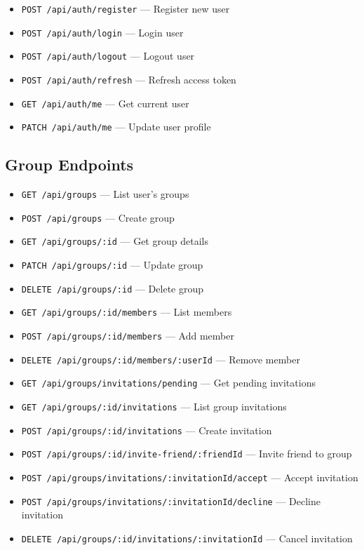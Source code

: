 \documentclass[11pt,a4paper]{article}
\begin{document}
\begin{itemize}
    \item \texttt{POST /api/auth/register} --- Register new user
    \item \texttt{POST /api/auth/login} --- Login user
    \item \texttt{POST /api/auth/logout} --- Logout user
    \item \texttt{POST /api/auth/refresh} --- Refresh access token
    \item \texttt{GET /api/auth/me} --- Get current user
    \item \texttt{PATCH /api/auth/me} --- Update user profile
\end{itemize}

\subsection{Group Endpoints}

\begin{itemize}
    \item \texttt{GET /api/groups} --- List user's groups
    \item \texttt{POST /api/groups} --- Create group
    \item \texttt{GET /api/groups/:id} --- Get group details
    \item \texttt{PATCH /api/groups/:id} --- Update group
    \item \texttt{DELETE /api/groups/:id} --- Delete group
    \item \texttt{GET /api/groups/:id/members} --- List members
    \item \texttt{POST /api/groups/:id/members} --- Add member
    \item \texttt{DELETE /api/groups/:id/members/:userId} --- Remove member
    \item \texttt{GET /api/groups/invitations/pending} --- Get pending invitations
    \item \texttt{GET /api/groups/:id/invitations} --- List group invitations
    \item \texttt{POST /api/groups/:id/invitations} --- Create invitation
    \item \texttt{POST /api/groups/:id/invite-friend/:friendId} --- Invite friend to group
    \item \texttt{POST /api/groups/invitations/:invitationId/accept} --- Accept invitation
    \item \texttt{POST /api/groups/invitations/:invitationId/decline} --- Decline invitation
    \item \texttt{DELETE /api/groups/:id/invitations/:invitationId} --- Cancel invitation
\end{itemize}
\end{document}
